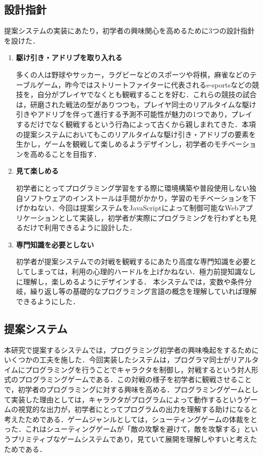 \subsection{設計指針}

提案システムの実装にあたり，初学者の興味関心を高めるために3つの設計指針を設けた．

\begin{enumerate}
  \item {\bf 駆け引き・アドリブを取り入れる}

  多くの人は野球やサッカー，ラグビーなどのスポーツや将棋，麻雀などのテーブルゲーム，昨今ではストリートファイターに代表されるe-sportsなどの競技を，自分がプレイヤでなくとも観戦することを好む．これらの競技の試合は，研磨された戦法の型がありつつも，プレイヤ同士のリアルタイムな駆け引きやアドリブを伴って進行する予測不可能性が魅力の1つであり，プレイするだけでなく観戦するという行為によって古くから親しまれてきた．本項の提案システムにおいてもこのリアルタイムな駆け引き・アドリブの要素を生かし，ゲームを観戦して楽しめるようデザインし，初学者のモチベーションを高めることを目指す．

  
  \item {\bf 見て楽しめる}

	初学者にとってプログラミング学習をする際に環境構築や普段使用しない独自ソフトウェアのインストールは手間がかかり，学習のモチベーションを下げかねない．今回は提案システムをJavaScriptによって制御可能なWebアプリケーションとして実装し，初学者が実際にプログラミングを行わずとも見るだけで利用できるように設計した．

	\item {\bf 専門知識を必要としない}
	
	初学者が提案システムでの対戦を観戦するにあたり高度な専門知識を必要としてしまっては，利用の心理的ハードルを上げかねない．極力前提知識なしに理解し，楽しめるようにデザインする．
	本システムでは，変数や条件分岐，繰り返し等の基礎的なプログラミング言語の概念を理解していれば理解できるようにした．

\end{enumerate}

\subsection{提案システム}

本研究で提案するシステムでは，プログラミング初学者の興味喚起をするためにいくつかの工夫を施した．今回実装したシステムは，プログラマ同士がリアルタイムにプログラミングを行うことでキャラクタを制御し，対戦するという対人形式のプログラミングゲームである．この対戦の様子を初学者に観戦させることで，初学者のプログラミングに対する興味を高める．プログラミングゲームとして実装した理由としては，キャラクタがプログラムによって動作するというゲームの視覚的な出力が，初学者にとってプログラムの出力を理解する助けになると考えたためである．ゲームジャンルとしては，シューティングゲームの体裁をとった．これはシューティングゲームが「敵の攻撃を避けて，敵を攻撃する」というプリミティブなゲームシステムであり，見ていて展開を理解しやすいと考えたためである．

